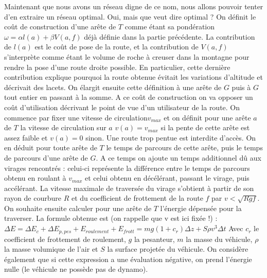 \documentclass[french]{article}
\begin{document}
		Maintenant que nous avons un réseau digne de ce nom, nous allons pouvoir tenter d'en extraire un réseau optimal. Oui, mais que veut dire optimal ?\newline
		\newline
		On définit le coût de construction d'une arête de $T$ comme étant sa pondération $\omega = \alpha l(a) + \beta V(a,f)$ déjà définie dans la partie précédente. La contribution de $l(a)$ est le coût de pose de la route, et la contribution de $V(a,f)$ s'interprète comme étant le volume de roche à creuser dans la montagne pour rendre la pose d'une route droite possible. En particulier, cette dernière contribution explique pourquoi la route obtenue évitait les variations d'altitude et décrivait des lacets. On élargit ensuite cette définition à une arête de $G$ puis à $G$ tout entier en passant à la somme.\newline
		\newline
		A ce coût de construction on va opposer un coût d'utilisation décrivant le point de vue d'un utilisateur de la route. On commence par fixer une vitesse de circulation$v_{max}$ et on définit pour une arête $a$ de $T$ la vitesse de circulation sur $a$ $v(a) = v_{max} $ si la pente de cette arête est assez faible et $v(a) = 0$ sinon. Une route trop pentue est interdite d'accès. On en déduit pour toute arête de $T$ le temps de parcours de cette arête, puis le temps de parcours d'une arête de $G$.\newline
		A ce temps on ajoute un temps additionnel dû aux virages rencontrés : celui-ci représente la différence entre le temps de parcours obtenu en roulant à $v_{max}$ et celui obtenu en décélérant, passant le virage, puis accélérant. La vitesse maximale de traversée du virage s'obtient à partir de son rayon de courbure $R$ et du coefficient de frottement de la route $f$ par $v < \sqrt{Rgf}$. \newline
		On souhaite ensuite calculer pour une arête de $T$ l'énergie dépensée pour la traverser. La formule obtenue est (on rappelle que v est ici fixée !) : \newline
		$\Delta E = \Delta E_{c} + \Delta E_{p,pes} + E_{roulement} + E_{frott} = m g (1+c_{r}) \Delta z + S \rho v^{3} \Delta t$ \newline
		Avec $c_{r}$ le coefficient de frottement de roulement, $g$ la pesanteur, $m$  la masse du véhicule, $\rho$ la masse volumique de l'air et $S$ la surface projetée du véhicule. On considère également que si cette expression a une évaluation négative, on prend l'énergie nulle (le véhicule ne possède pas de dynamo).\newline
\end{document}
